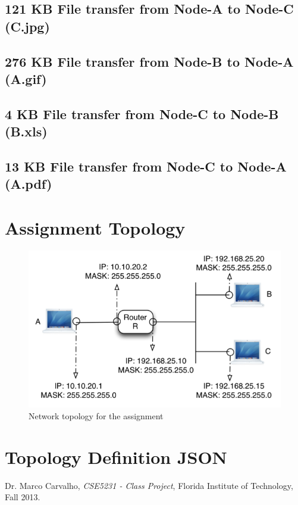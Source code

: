 \documentclass{scrartcl}
\begin{document}
\subsection{121 KB File transfer from Node-A to Node-C (C.jpg)}

\newpage
\subsection{276 KB File transfer from Node-B to Node-A (A.gif)}

\newpage
\subsection{4 KB File transfer from Node-C to Node-B (B.xls)}

\newpage
\subsection{13 KB File transfer from Node-C to Node-A (A.pdf)}


\newpage
\appendix
\section{Assignment Topology} \label{appending:topo-img}
\begin{figure}[H]
\centering
\includegraphics[scale=.65]{topology.png}
\caption{Network topology for the assignment}
\label{fig:topo}
\end{figure}
\newpage
\section{Topology Definition JSON} \label{appendix:topology}


\newpage
%
%
\begin{thebibliography}{30}
 Dr. Marco Carvalho, \emph{CSE5231 - Class Project}, Florida Institute of Technology, Fall 2013.
    
\end{thebibliography}
\end{document}
